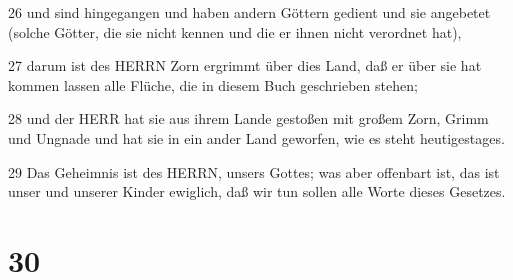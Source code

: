 \par 26 und sind hingegangen und haben andern Göttern gedient und sie angebetet (solche Götter, die sie nicht kennen und die er ihnen nicht verordnet hat),
\par 27 darum ist des HERRN Zorn ergrimmt über dies Land, daß er über sie hat kommen lassen alle Flüche, die in diesem Buch geschrieben stehen;
\par 28 und der HERR hat sie aus ihrem Lande gestoßen mit großem Zorn, Grimm und Ungnade und hat sie in ein ander Land geworfen, wie es steht heutigestages.
\par 29 Das Geheimnis ist des HERRN, unsers Gottes; was aber offenbart ist, das ist unser und unserer Kinder ewiglich, daß wir tun sollen alle Worte dieses Gesetzes.

\chapter{30}

